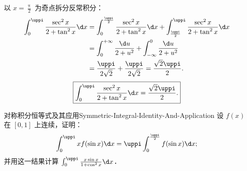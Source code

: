 \begin{solution}
    以 $x = \frac{\uppi}{2}$ 为奇点拆分反常积分：
    \begin{equation}
        \begin{aligned}
            \int_0^{\uppi} \frac{\sec^2 x}{2 + \tan^2 x} \d x & = \int_0^{\frac{\uppi}{2}} \frac{\sec^2 x}{2 + \tan^2 x} \d x + \int_{\frac{\uppi}{2}}^{\uppi} \frac{\sec^2 x}{2 + \tan^2 x} \d x \\
                                                              & = \int_0^{+\infty} \frac{\d u}{2 + u^2} + \int_{-\infty}^0 \frac{\d u}{2 + u^2}                                                   \\
                                                              & = \frac{\uppi}{2\sqrt{2}} + \frac{\uppi}{2\sqrt{2}} = \frac{\sqrt{2}\uppi}{2}.
        \end{aligned}
    \end{equation}
    \begin{equation}
        \boxed{\int_0^{\uppi} \frac{\sec^2 x}{2 + \tan^2 x} \d x = \frac{\sqrt{2}\uppi}{2}.}
    \end{equation}
\end{solution}

\begin{problem}{对称积分恒等式及其应用}{Symmetric-Integral-Identity-And-Application}
    设 $f(x)$ 在 $[0, 1]$ 上连续，证明：
    \begin{equation}
        \int_0^{\uppi} x f(\sin x) \d x = \uppi \int_0^{\frac{\uppi}{2}} f(\sin x) \d x;
    \end{equation}
    并用这一结果计算 $\int_0^{\uppi} \frac{x\sin x}{1 + \cos^2 x} \d x$．
\end{problem}

